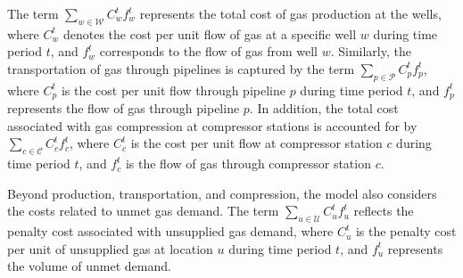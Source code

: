 The term $\sum_{w \in \mathcal{W}} C_{w}^t {f_{w}^t}$ represents the total cost of gas production at the wells, where $C_{w}^t$ denotes the cost per unit flow of gas at a specific well $w$ during time period $t$, and $f_{w}^t$ corresponds to the flow of gas from well $w$. Similarly, the transportation of gas through pipelines is captured by the term $\sum_{p \in \mathcal{P}} C_{p}^t {f_{p}^t}$, where $C_{p}^t$ is the cost per unit flow through pipeline $p$ during time period $t$, and $f_{p}^t$ represents the flow of gas through pipeline $p$. In addition, the total cost associated with gas compression at compressor stations is accounted for by $\sum_{c \in \mathcal{C}} C_{c}^t {f_{c}^t}$, where $C_{c}^t$ is the cost per unit flow at compressor station $c$ during time period $t$, and $f_{c}^t$ is the flow of gas through compressor station $c$.

Beyond production, transportation, and compression, the model also considers the costs related to unmet gas demand. The term $\sum_{u \in \mathcal{U}} C_{u}^{t} {f_{u}^{t}}$ reflects the penalty cost associated with unsupplied gas demand, where $C_{u}^{t}$ is the penalty cost per unit of unsupplied gas at location $u$ during time period $t$, and $f_{u}^{t}$ represents the volume of unmet demand. 





